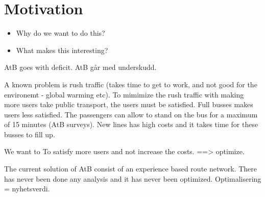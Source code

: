 \section{Motivation}
\begin{itemize}
\item Why do we want to do this?
\item What makes this interesting?
\end{itemize}

AtB goes with deficit. AtB går med underskudd. 

A known problem is rush traffic (takes time to get to work, and not good for the environemt - global warming etc). To mimimize the rush traffic with making more
users take public transport, the users must be satisfied. Full busses makes users less satisfied. The passengers can allow to stand on the bus for a maximum of 15 minutes (AtB surveys). New lines has high costs and it takes time for these busses to fill up. 

We want to To satisfy more users and not increase the costs. ==> optimize. 

The current solution of AtB consist of an experience based route network. There has never been done any analysis and it has never been optimized. Optimalisering = nyhetsverdi.




